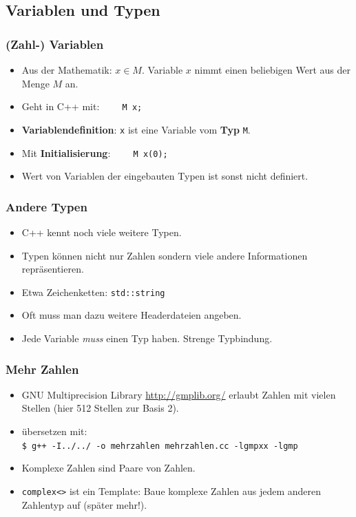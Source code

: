 \documentclass[ignorenonframetext,12pt]{beamer}
\theoremstyle{definition}
\theoremstyle{definition}
\begin{document}
\subsection{Variablen und Typen}

\begin{frame}[fragile]
\frametitle{(Zahl-) Variablen}
\begin{itemize}
\item Aus der Mathematik: \glqq{}$x\in M$\grqq{}. Variable $x$ nimmt einen
  beliebigen Wert aus der Menge $M$ an.
\item Geht in C++ mit: \lstinline{    M x;}
\item \textbf{Variablendefinition}:
\lstinline{x} ist eine Variable vom \textbf{Typ} \lstinline{M}.
\item Mit \textbf{Initialisierung}: \lstinline{    M x(0);}
\item Wert von Variablen der \glqq{}eingebauten\grqq{} Typen ist sonst
  nicht definiert.
\end{itemize}

\end{frame}

\begin{frame}[fragile]
\frametitle{Andere Typen}
\begin{itemize}
\item C++ kennt noch viele weitere Typen.
\item Typen können nicht nur Zahlen sondern viele andere Informationen
  repräsentieren.
\item Etwa Zeichenketten: \lstinline{std::string}
\item Oft muss man dazu weitere Headerdateien angeben.

\item Jede Variable \textsl{muss} einen Typ haben. Strenge Typbindung.
\end{itemize}
\end{frame}

\begin{frame}[fragile]
\frametitle{Mehr Zahlen}

\begin{itemize}
\item GNU Multiprecision Library \url{http://gmplib.org/} erlaubt
  Zahlen mit vielen Stellen (hier 512 Stellen zur Basis 2).
\item übersetzen mit:\\
{\scriptsize\lstinline{$ g++ -I../../ -o mehrzahlen mehrzahlen.cc -lgmpxx -lgmp}} %
\item Komplexe Zahlen sind Paare von Zahlen.
\item \lstinline{complex<>} ist ein Template: Baue komplexe Zahlen aus
  jedem anderen Zahlentyp auf (später mehr!).
\end{itemize}
\end{frame}
\end{document}
